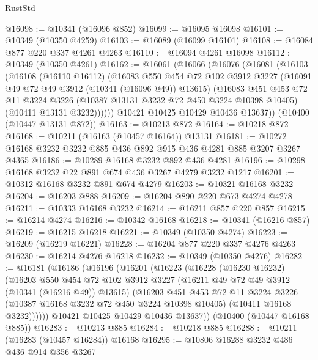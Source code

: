 \begin{lexlean}{RustStd}
\begin{coremodule}
@16098 := @10341 (@16096 @852)
@16099 := @16095 @16098
@16101 := @10349 (@10350 @4259)
@16103 := @16089 (@16099 @16101)
@16108 := @16084 @877 @220 @337 @4261 @4263
@16110 := @16094 @4261 @16098
@16112 := @10349 (@10350 @4261)
@16162 := @16061
    (@16066
      (@16076
        (@16081
          (@16103
            (@16108
              (@16110 @16112)
              (@16083
                @550
                @454
                @72
                @102
                @3912
                @3227
                (@16091 @49 @72 @49 @3912 (@10341 (@16096 @49)) @13615)
                (@16083
                  @451
                  @453
                  @72
                  @11
                  @3224
                  @3226
                  (@10387 @13131 @3232 @72 @450 @3224 @10398 @10405)
                  (@10411 @13131 @3232))))))
        @10421
        @10425
        @10429
        @10436
        @13637))
    (@10400 (@10447 @13131 @872))
@16163 := @10213 @872
@16164 := @10218 @872
@16168 := @10211 (@16163 (@10457 @16164)) @13131
@16181 := @10272 @16168 @3232 @3232 @885 @436 @892 @915 @436 @4281 @885 @3207 @3267 @4365
@16186 := @10289 @16168 @3232 @892 @436 @4281
@16196 := @10298 @16168 @3232 @22 @891 @674 @436 @3267 @4279 @3232 @1217
@16201 := @10312 @16168 @3232 @891 @674 @4279
@16203 := @10321 @16168 @3232
@16204 := @16203 @888
@16209 := @16204 @890 @220 @673 @4274 @4278
@16211 := @10333 @16168 @3232
@16214 := @16211 @857 @220 @857
@16215 := @16214 @4274
@16216 := @10342 @16168
@16218 := @10341 (@16216 @857)
@16219 := @16215 @16218
@16221 := @10349 (@10350 @4274)
@16223 := @16209 (@16219 @16221)
@16228 := @16204 @877 @220 @337 @4276 @4263
@16230 := @16214 @4276 @16218
@16232 := @10349 (@10350 @4276)
@16282 := @16181
    (@16186
      (@16196
        (@16201
          (@16223
            (@16228
              (@16230 @16232)
              (@16203
                @550
                @454
                @72
                @102
                @3912
                @3227
                (@16211 @49 @72 @49 @3912 (@10341 (@16216 @49)) @13615)
                (@16203
                  @451
                  @453
                  @72
                  @11
                  @3224
                  @3226
                  (@10387 @16168 @3232 @72 @450 @3224 @10398 @10405)
                  (@10411 @16168 @3232))))))
        @10421
        @10425
        @10429
        @10436
        @13637))
    (@10400 (@10447 @16168 @885))
@16283 := @10213 @885
@16284 := @10218 @885
@16288 := @10211 (@16283 (@10457 @16284)) @16168
@16295 := @10806 @16288 @3232 @486 @436 @914 @356 @3267

\end{coremodule}
\end{lexlean}
